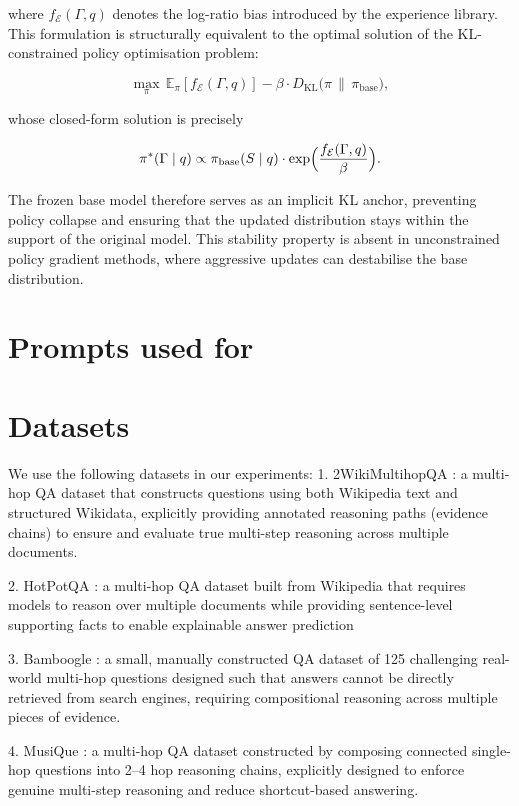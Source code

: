 where $f_{\mathcal{E}}(\Gamma, q)$ denotes the log-ratio bias introduced by the experience library. This formulation is structurally equivalent to the optimal solution of the KL-constrained policy optimisation problem:

\[
\max_{\pi} \, \mathbb{E}_{\pi}[f_{\mathcal{E}}(\Gamma, q)] - \beta \cdot D_{\mathrm{KL}}\bigl(\pi \,\|\, \pi_{\text{base}}\bigr),
\]

whose closed-form solution is precisely

\[
\pi^*(\Gamma \mid q) \propto \pi_{\text{base}}(S \mid q) \cdot \exp\Bigl(\frac{f_{\mathcal{E}}(\Gamma, q)}{\beta}\Bigr).
\]

The frozen base model therefore serves as an implicit KL anchor, preventing policy collapse and ensuring that the updated distribution stays within the support of the original model. This stability property is absent in unconstrained policy gradient methods, where aggressive updates can destabilise the base distribution.
\newpage
\section{Prompts used for \hero}
\label{app:promptt}


\section{Datasets}
\label{app:dataset}
We use the following datasets in our experiments: 
1. 2WikiMultihopQA \citep{ho-etal-2020-constructing}: a multi-hop QA dataset that constructs questions using both Wikipedia text and structured Wikidata, explicitly providing annotated reasoning paths (evidence chains) to ensure and evaluate true multi-step reasoning across multiple documents.

2. HotPotQA \citep{yang2018hotpotqa}: a multi-hop QA dataset built from Wikipedia that requires models to reason over multiple documents while providing sentence-level supporting facts to enable explainable answer prediction

3. Bamboogle \citep{press-etal-2023-measuring}: a small, manually constructed QA dataset of 125 challenging real-world multi-hop questions designed such that answers cannot be directly retrieved from search engines, requiring compositional reasoning across multiple pieces of evidence.

4. MusiQue \citep{trivedi2021musique}: a multi-hop QA dataset constructed by composing connected single-hop questions into 2–4 hop reasoning chains, explicitly designed to enforce genuine multi-step reasoning and reduce shortcut-based answering.

